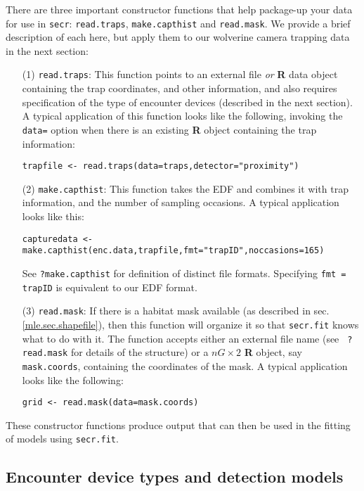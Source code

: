 There are three important constructor functions that help package-up
your 
data for use in \mbox{\tt secr}:
\mbox{\tt read.traps},
\mbox{\tt make.capthist} and
\mbox{\tt read.mask}. 
We provide a brief description of each here, but apply them to our
wolverine camera trapping data in the next section:
\begin{itemize}
\item[(1)] 
\mbox{\tt read.traps}: This function points to an external file {\it or}
{\bf R} data object containing the trap coordinates, and other
information, and also requires specification of the type of encounter
devices (described in the next section). A typical application of this
function looks like the following, invoking the \mbox{\tt data=} option 
when there is an existing {\bf R} object
containing the trap information:
\begin{verbatim}
trapfile <- read.traps(data=traps,detector="proximity")
\end{verbatim}
\item[(2)] \mbox{\tt make.capthist}: This function takes the EDF and combines it
with trap information, and the number of sampling occasions. A typical
application looks like this:
\begin{verbatim}
capturedata <- make.capthist(enc.data,trapfile,fmt="trapID",noccasions=165)
\end{verbatim}
See \mbox{\tt ?make.capthist} for definition of distinct file
formats. Specifying  \mbox{\tt fmt = trapID}  is equivalent to our EDF format.
\item[(3)] \mbox{\tt read.mask}: If there is a habitat mask
  available 
(as described in sec. \ref{mle.sec.shapefile}), then this function
will organize it so that \mbox{\tt secr.fit} knows what to do with it.
The function accepts either an external file name (see \mbox{\tt
  ?read.mask} for details of the structure) or a $nG \times 2$ {\bf R}
object, say \mbox{\tt mask.coords},
containing the coordinates of the mask. A typical application looks
like the following:
\begin{verbatim}
grid <- read.mask(data=mask.coords)
\end{verbatim}
\end{itemize}
These constructor functions produce output that can then be used in
the fitting of models using \mbox{\tt secr.fit}.

\subsection{Encounter device types and detection models}

